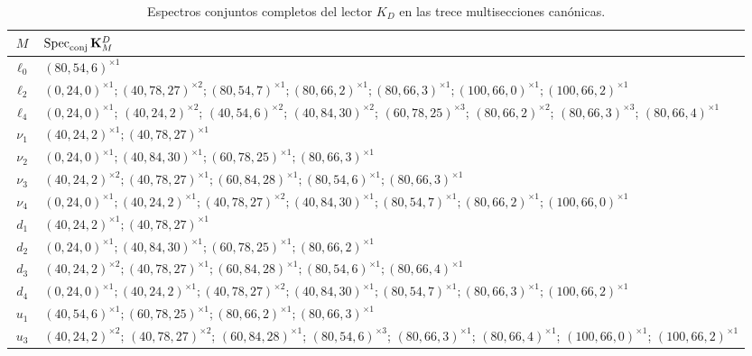 \begingroup\footnotesize
\begin{longtable}{@{}c p{}@{}}
\caption{Espectros conjuntos completos del lector \(K_D\) en las trece
multisecciones canónicas.}
\\
\toprule
\(M\)&\(\operatorname{Spec}_{\rm conj}\mathbf K_M^D\)\\
\midrule
\endhead
\(\ell_0\)&\((80,54,6)^{\times1}\)\\
\(\ell_2\)&\((0,24,0)^{\times1};(40,78,27)^{\times2};(80,54,7)^{\times1};(80,66,2)^{\times1};(80,66,3)^{\times1};(100,66,0)^{\times1};(100,66,2)^{\times1}\)\\
\(\ell_4\)&\((0,24,0)^{\times1}\); \((40,24,2)^{\times2}\); \((40,54,6)^{\times2}\); \((40,84,30)^{\times2}\); \((60,78,25)^{\times3}\); \((80,66,2)^{\times2}\); \((80,66,3)^{\times3}\); \((80,66,4)^{\times1}\)\\
\(\nu_1\)&\((40,24,2)^{\times1};(40,78,27)^{\times1}\)\\
\(\nu_2\)&\((0,24,0)^{\times1};(40,84,30)^{\times1};(60,78,25)^{\times1};(80,66,3)^{\times1}\)\\
\(\nu_3\)&\((40,24,2)^{\times2};(40,78,27)^{\times1};(60,84,28)^{\times1};(80,54,6)^{\times1};(80,66,3)^{\times1}\)\\
\(\nu_4\)&\((0,24,0)^{\times1};(40,24,2)^{\times1};(40,78,27)^{\times2};(40,84,30)^{\times1};(80,54,7)^{\times1};(80,66,2)^{\times1};(100,66,0)^{\times1}\)\\
\(d_1\)&\((40,24,2)^{\times1};(40,78,27)^{\times1}\)\\
\(d_2\)&\((0,24,0)^{\times1};(40,84,30)^{\times1};(60,78,25)^{\times1};(80,66,2)^{\times1}\)\\
\(d_3\)&\((40,24,2)^{\times2};(40,78,27)^{\times1};(60,84,28)^{\times1};(80,54,6)^{\times1};(80,66,4)^{\times1}\)\\
\(d_4\)&\((0,24,0)^{\times1};(40,24,2)^{\times1};(40,78,27)^{\times2};(40,84,30)^{\times1};(80,54,7)^{\times1};(80,66,3)^{\times1};(100,66,2)^{\times1}\)\\
\(u_1\)&\((40,54,6)^{\times1};(60,78,25)^{\times1};(80,66,2)^{\times1};(80,66,3)^{\times1}\)\\
\(u_3\)&\((40,24,2)^{\times2}\); \((40,78,27)^{\times2}\); \((60,84,28)^{\times1}\); \((80,54,6)^{\times3}\); \((80,66,3)^{\times1}\); \((80,66,4)^{\times1}\); \((100,66,0)^{\times1}\); \((100,66,2)^{\times1}\)\\
\bottomrule
\end{longtable}
\label{tab:espectros-kd-multisecciones-rev11}
\endgroup

